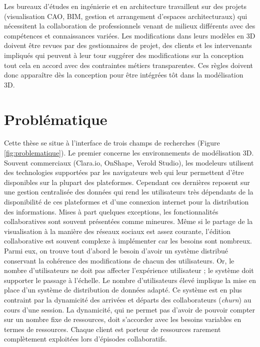 Les bureaux d'études en ingénierie et en architecture travaillent sur des projets 
(visualisation \gls{CAO}, \gls{BIM}, gestion et arrangement d'espaces 
architecturaux) qui 
nécessitent la collaboration de professionnels venant de milieux différents avec 
des compétences et connaissances variées. Les modifications dans leurs 
modèles en \gls{3D} doivent être revues par des gestionnaires de projet, des 
clients et les intervenants impliqués qui peuvent à leur tour suggérer des 
modifications sur la conception tout cela en accord avec des contraintes métiers 
transparentes. Ces règles doivent donc apparaître dès la conception pour être 
intégrées tôt dans la modélisation 3D.

%
\section{Problématique}


Cette thèse se situe à l'interface de trois champs de recherches (Figure 
\ref{fig:problematique}). Le premier concerne les environnements de modélisation 
3D. Souvent commerciaux (Clara.io, OnShape, Verold Studio), les modeleurs 
utilisent des technologies supportées par les navigateurs web qui leur permettent 
d'être disponibles sur la plupart des plateformes. 
Cependant ces dernières reposent sur une gestion centralisée des données qui rend 
les utilisateurs très dépendants de la disponibilité de ces plateformes et d'une 
connexion internet pour la distribution des informations. 
Mises à part quelques exceptions, les fonctionnalités collaboratives 
sont souvent présentées comme mineures. Même si le \og partage\fg{} de la 
visualisation à la manière des \og réseaux sociaux\fg{} est assez courante, l'édition 
collaborative est souvent complexe à implémenter car les besoins sont nombreux. 
Parmi eux, on trouve tout d'abord le besoin d'avoir un système distribué 
conservant la cohérence des modifications de chacun des utilisateurs. Or, 
le nombre d'utilisateurs ne doit pas affecter l'expérience utilisateur ; le système 
doit supporter le passage à l'échelle. 
Le nombre d'utilisateurs élevé implique la mise en place d'un système de 
distribution de données adapté. Ce système est en plus contraint par la dynamicité
des arrivées et départs des collaborateurs (\textit{churn}) au cours d'une session. 
La dynamicité, qui ne permet pas d'avoir de pouvoir compter sur un nombre fixe de 
ressources, doit s'accorder avec les besoins variables en termes de ressources. 
Chaque client est porteur de ressources rarement complètement exploitées lors 
d'épisodes collaboratifs.

